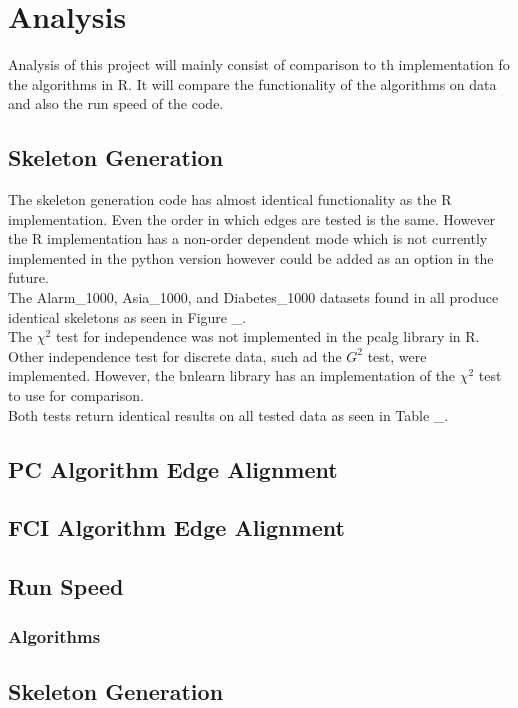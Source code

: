 \documentclass{article}
\begin{document}
\section{Analysis}
Analysis of this project will mainly consist of comparison to th implementation fo the algorithms in R. It will compare the functionality of the algorithms on data and also the run speed of the code.\\

\subsection{Skeleton Generation}
The skeleton generation code has almost identical functionality as the R implementation. Even the order in which edges are tested is the same. However the R implementation has a non-order dependent mode which is not currently implemented in the python version however could be added as an option in the future.\\

The Alarm\_1000, Asia\_1000, and Diabetes\_1000 datasets found in  all produce identical skeletons as seen in Figure \_.\\

The $\chi^2$ test for independence was not implemented in the pcalg library in R. Other independence test for discrete data, such ad the $G^2$ test, were implemented. However, the bnlearn library has an implementation of the $\chi^2$ test to use for comparison.\\

Both tests return identical results on all tested data as seen in Table \_.
\subsection{PC Algorithm Edge Alignment}
\subsection{FCI Algorithm Edge Alignment}
\subsection{Run Speed}
\subsubsection{Algorithms}
\subsection{Skeleton Generation}
\end{document}
